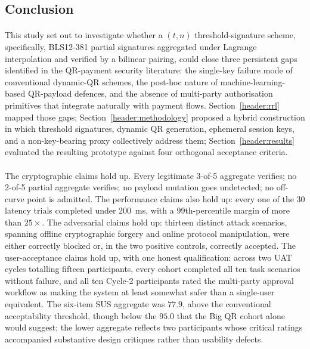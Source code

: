 \subsection{Conclusion}
\label{sect:conclusion}

\paragraph{}This study set out to investigate whether a $(t, n)$ threshold-signature scheme, specifically, BLS12-381 partial signatures aggregated under Lagrange interpolation and verified by a bilinear pairing, could close three persistent gaps identified in the QR-payment security literature: the single-key failure mode of conventional dynamic-QR schemes, the post-hoc nature of machine-learning-based QR-payload defences, and the absence of multi-party authorisation primitives that integrate naturally with payment flows. Section~\ref{header:rrl} mapped those gaps; Section~\ref{header:methodology} proposed a hybrid construction in which threshold signatures, dynamic QR generation, ephemeral session keys, and a non-key-bearing proxy collectively address them; Section~\ref{header:results} evaluated the resulting prototype against four orthogonal acceptance criteria.

\paragraph{}The cryptographic claims hold up. Every legitimate 3-of-5 aggregate verifies; no 2-of-5 partial aggregate verifies; no payload mutation goes undetected; no off-curve point is admitted. The performance claims also hold up: every one of the 30 latency trials completed under 200~ms, with a 99th-percentile margin of more than $25\times$. The adversarial claims hold up: thirteen distinct attack scenarios, spanning offline cryptographic forgery and online protocol manipulation, were either correctly blocked or, in the two positive controls, correctly accepted. The user-acceptance claims hold up, with one honest qualification: across two UAT cycles totalling fifteen participants, every cohort completed all ten task scenarios without failure, and all ten Cycle-2 participants rated the multi-party approval workflow as making the system at least somewhat safer than a single-user equivalent. The six-item SUS aggregate was $77.9$, above the conventional acceptability threshold, though below the $95.0$ that the Big QR cohort alone would suggest; the lower aggregate reflects two participants whose critical ratings accompanied substantive design critiques rather than usability defects.

